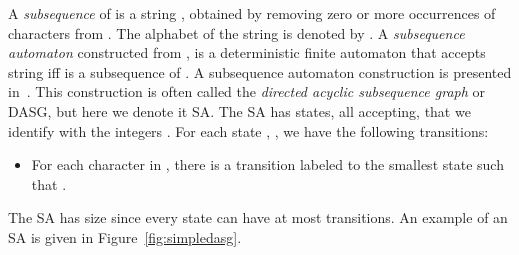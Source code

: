 \documentclass[a4paper,11pt]{article}
\begin{document}
A \emph{subsequence} of  is a string , obtained by removing zero or more occurrences of characters from . The alphabet of the string  is denoted by .
A \emph{subsequence automaton} constructed from , is a deterministic finite automaton that accepts string  iff  is a subsequence of . A subsequence automaton construction is presented in~\cite{BaezaYates1991}. This construction is often called the \emph{directed acyclic subsequence graph} or DASG, but here we denote it SA.
The SA has  states, all accepting, that we identify with the integers .
For each state , , we have the following transitions:
\begin{itemize}
\item For each character  in , there is a transition labeled  to the smallest state  such that .
\end{itemize}
The SA has size  since every state can have at most  transitions.
An example of an SA is given in Figure~\ref{fig:simpledasg}.
\end{document}
